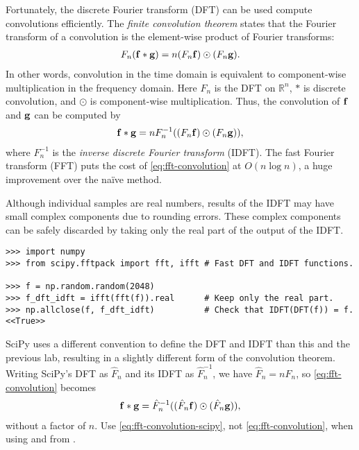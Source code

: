 Fortunately, the discrete Fourier transform (DFT) can be used compute convolutions efficiently.
The \emph{finite convolution theorem} states that the Fourier transform of a convolution is the element-wise product of Fourier transforms:
\begin{align}
F_n(\mathbf{f} \ast \mathbf{g}) = n(F_n\mathbf{f})\odot (F_n\mathbf{g}).
\label{eq:convolution-theorem}
\end{align}
In other words, convolution in the time domain is equivalent to component-wise multiplication in the frequency domain.
Here $F_n$ is the DFT on $\mathbb{R}^n$, $\ast$ is discrete convolution, and $\odot$ is component-wise multiplication. %
Thus, the convolution of $\mathbf{f}$ and $\mathbf{g}$ can be computed by
\begin{align}
\mathbf{f} \ast \mathbf{g} = nF_n^{-1}((F_n\mathbf{f})\odot (F_n\mathbf{g})),
\label{eq:fft-convolution}
\end{align}
where $F_n^{-1}$ is the \emph{inverse discrete Fourier transform} (IDFT).
The fast Fourier transform (FFT) puts the cost of \eqref{eq:fft-convolution} at $O(n\log{n})$, a huge improvement over the na\"ive method.

\begin{info} %
Although individual samples are real numbers, results of the IDFT may have small complex components due to rounding errors.
These complex components can be safely discarded by taking only the real part of the output of the IDFT.

\begin{lstlisting}
>>> import numpy
>>> from scipy.fftpack import fft, ifft # Fast DFT and IDFT functions.

>>> f = np.random.random(2048)
>>> f_dft_idft = ifft(fft(f)).real      # Keep only the real part.
>>> np.allclose(f, f_dft_idft)          # Check that IDFT(DFT(f)) = f.
<<True>>
\end{lstlisting}
\end{info}

\begin{warn} %
SciPy uses a different convention to define the DFT and IDFT than this and the previous lab, resulting in a slightly different form of the convolution theorem.
Writing SciPy's DFT as $\hat{F}_n$ and its IDFT as $\hat{F}_n^{-1}$, we have $\hat{F}_n = n F_n$, so \eqref{eq:fft-convolution} becomes
\begin{align}
\mathbf{f} \ast \mathbf{g} = \hat{F}_n^{-1}((\hat{F}_n\mathbf{f})\odot (\hat{F}_n\mathbf{g})),
\label{eq:fft-convolution-scipy}
\end{align}
without a factor of $n$.
Use \eqref{eq:fft-convolution-scipy}, not \eqref{eq:fft-convolution}, when using  and  from .
\end{warn}

